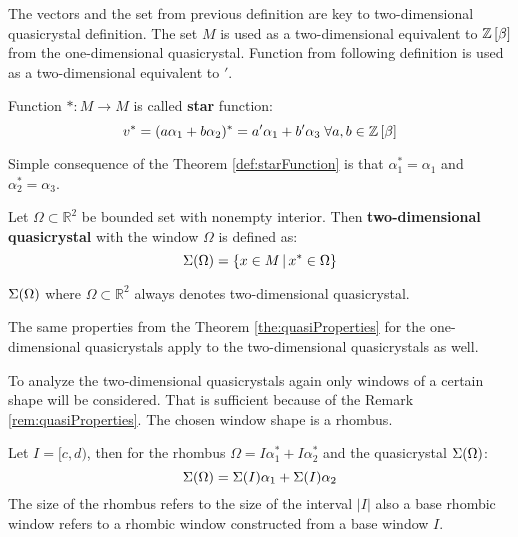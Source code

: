 \documentclass[text.tex]{subfiles}
\begin{document}
\begin{remark}
The vectors and the set from previous definition are key to two-dimensional quasicrystal definition. The set $M$ is used as a two-dimensional equivalent to $\mathbb{Z}\left[\beta\right]$ from the one-dimensional quasicrystal. Function from following definition is used as a two-dimensional equivalent to $'$.
\end{remark}

\begin{definition}
\label{def:starFunction}
Function $\ast: M \to M$ is called \textbf{star} function:
$$v^\ast = (a\alpha_1 + b\alpha_2)^\ast = a'\alpha_1 + b'\alpha_3 \;\forall a,b\in\mathbb{Z}\left[\beta\right]$$
\end{definition}

\begin{remark}
Simple consequence of the Theorem \ref{def:starFunction} is that $\alpha_1^\ast = \alpha_1$ and $\alpha_2^\ast = \alpha_3$.
\end{remark}

\begin{definition}
Let $\Omega \subset \mathbb{R}^2$ be bounded set with nonempty interior. Then \textbf{two-dimensional quasicrystal} with the window $\Omega$ is defined as:
$$\Sigma(\Omega) = \left\{ x \in M\,|\,x^\ast \in \Omega \right\}$$
\end{definition}

\begin{remark}
$\Sigma(\Omega)$ where $\Omega \subset \mathbb{R}^2$ always denotes two-dimensional quasicrystal.
\end{remark}

\begin{remark}
\label{rem:quasiProperties}
The same properties from the Theorem \ref{the:quasiProperties} for the one-dimensional quasicrystals apply to the two-dimensional quasicrystals as well.
\end{remark}

To analyze the two-dimensional quasicrystals again only windows of a certain shape will be considered. That is sufficient because of the Remark \ref{rem:quasiProperties}. The chosen window shape is a rhombus. 

\begin{theorem}
\label{the:twoToOne}
Let $I = [c,d)$, then for the rhombus $\Omega = I\alpha_1^\ast + I\alpha_2^\ast$ and the quasicrystal $\Sigma(\Omega)$: 
$$\Sigma(\Omega) = \Sigma(I)\alpha_1 + \Sigma(I)\alpha_2$$
The size of the rhombus refers to the size of the interval $|I|$ also a base rhombic window refers to a rhombic window constructed from a base window $I$.
\end{theorem}
\end{document}
